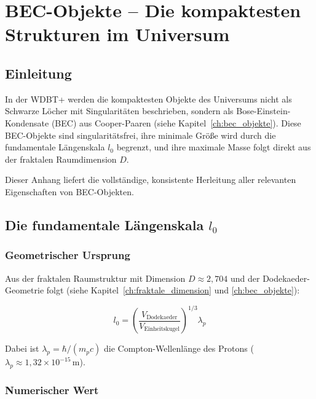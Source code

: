
\chapter{BEC-Objekte – Die kompaktesten Strukturen im Universum}
\label{app:bec}

\section{Einleitung}
\label{app:bec_einleitung}

In der WDBT+ werden die kompaktesten Objekte des Universums nicht als Schwarze Löcher mit Singularitäten beschrieben, sondern als Bose-Einstein-Kondensate (BEC) aus Cooper-Paaren (siehe Kapitel~\ref{ch:bec_objekte}). Diese BEC-Objekte sind singularitätsfrei, ihre minimale Größe wird durch die fundamentale Längenskala \( l_0 \) begrenzt, und ihre maximale Masse folgt direkt aus der fraktalen Raumdimension \( D \).

Dieser Anhang liefert die vollständige, konsistente Herleitung aller relevanten Eigenschaften von BEC-Objekten.

\section{Die fundamentale Längenskala \( l_0 \)}
\label{app:bec_l0}

\subsection{Geometrischer Ursprung}
\label{sub:bec_l0_ursprung}

Aus der fraktalen Raumstruktur mit Dimension \( D \approx 2,704 \) und der Dodekaeder-Geometrie folgt (siehe Kapitel~\ref{ch:fraktale_dimension} und \ref{ch:bec_objekte}):

\[
l_0 = \left( \frac{V_{\text{Dodekaeder}}}{V_{\text{Einheitskugel}}} \right)^{1/3} \lambda_p \tag{K.1}
\]

Dabei ist \( \lambda_p = \hbar / (m_p c) \) die Compton-Wellenlänge des Protons (\( \lambda_p \approx 1,32 \times 10^{-15} \, \text{m} \)).

\subsection{Numerischer Wert}
\label{sub:bec_l0_numerisch}

